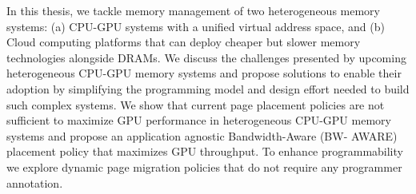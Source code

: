 In this thesis, we tackle memory management of two heterogeneous memory systems:
(a) CPU-GPU systems with a unified virtual address space, and (b) Cloud
computing platforms that can deploy cheaper but slower memory technologies
alongside DRAMs. We discuss the challenges presented by upcoming heterogeneous
CPU-GPU memory systems and propose solutions to enable their adoption by
simplifying the programming model and design effort needed to build such complex
systems. We show that current page placement policies are not sufficient to
maximize GPU performance in heterogeneous CPU-GPU memory systems and propose an
application agnostic Bandwidth-Aware (BW- AWARE) placement policy that maximizes
GPU throughput.
%
To enhance programmability we explore dynamic page migration policies that do
not require any programmer annotation.
